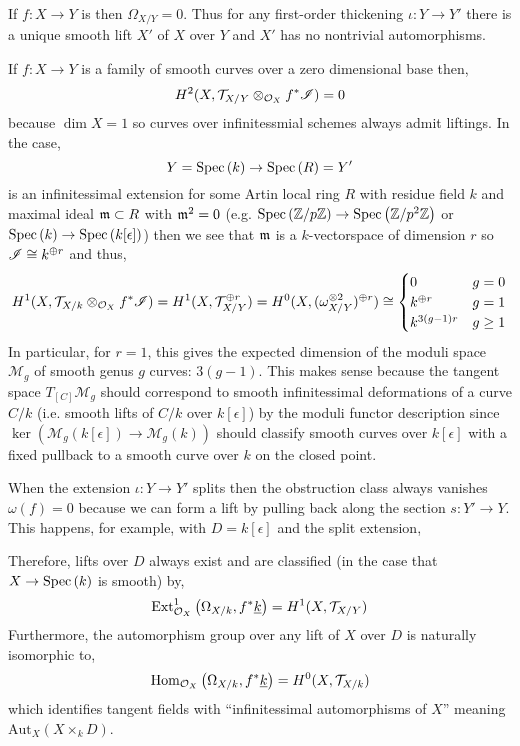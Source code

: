 \documentclass[12pt]{article}
\begin{document}
\begin{example}
If $f : X \to Y$ is \etale then $\Omega_{X/Y} = 0$. Thus for any first-order thickening $\iota : Y \to Y'$ there is a unique smooth lift $X'$ of $X$ over $Y$ and $X'$ has no nontrivial automorphisms.
\end{example}

\begin{example}
If $f : X \to Y$ is a family of smooth curves over a zero dimensional base then, 
\[ H^2(X, \mathcal{T}_{X/Y} \otimes_{\mathcal{O}_{X}} f^* \mathscr{I}) = 0 \]
because $\dim{X} = 1$ so curves over infinitessmial schemes always admit liftings. In the case,
\[ Y = \mathrm{Spec}\left( k \right) \to \mathrm{Spec}\left( R \right) = Y' \]
is an infinitessimal extension for some Artin local ring $R$ with residue field $k$ and maximal ideal $\mathfrak{m} \subset R$ with $\mathfrak{m}^2 = 0$ (e.g. $\mathrm{Spec}\left( \mathbb{Z}/p\mathbb{Z} \right) \to \mathrm{Spec}\left( \mathbb{Z}/p^2\mathbb{Z} \right)$ or $\mathrm{Spec}\left( k \right) \to \mathrm{Spec}\left( k[\epsilon] \right)$) then we see that $\mathfrak{m}$ is a $k$-vectorspace of dimension $r$ so $\mathscr{I} \cong k^{\oplus r}$ and thus,
\[ H^1(X, \mathcal{T}_{X/k} \otimes_{\mathcal{O}_{X}} f^* \mathscr{I}) = H^1(X, \mathcal{T}_{X/Y}^{\oplus r}) = H^0(X, (\omega_{X/Y}^{\otimes 2})^{\oplus r}) \cong 
\begin{cases}
0 & g = 0
\\
k^{\oplus r} & g = 1
\\
k^{3(g-1)r} & g \ge 1 
\end{cases} \]
In particular, for $r = 1$, this gives the expected dimension of the moduli space $\mathcal{M}_g$ of smooth genus $g$ curves: $3(g-1)$. This makes sense because the tangent space $T_{[C]} \mathcal{M}_g$ should correspond to smooth infinitessimal deformations of a curve $C/k$ (i.e. smooth lifts of $C/k$ over $k[\epsilon]$) by the moduli functor description since $\ker{(\mathcal{M}_g(k[\epsilon]) \to \mathcal{M}_g(k))}$ should classify smooth curves over $k[\epsilon]$ with a fixed pullback to a smooth curve over $k$ on the closed point.
\end{example}

\begin{example}
When the extension $\iota : Y \to Y'$ splits then the obstruction class always vanishes $\omega(f) = 0$ because we can form a lift by pulling back along the section $s : Y' \to Y$. This happens, for example, with $D = k[\epsilon]$ and the split extension,
\begin{center}
\end{center}
Therefore, lifts over $D$ always exist and are classified (in the case that $X \to \mathrm{Spec}\left( k \right)$ is smooth) by,
\[ \mathrm{Ext}^{1}_{\mathcal{O}_{X}} \left( \Omega_{X/k}, f^* \underline{k} \right) = H^1(X, \mathcal{T}_{X/Y}) \]
Furthermore, the automorphism group over any lift of $X$ over $D$ is naturally isomorphic to,
\[ \mathrm{Hom}_{\mathcal{O}_{X}} \left( \Omega_{X/k}, f^* \underline{k} \right) = H^0(X, \mathcal{T}_{X/k}) \]
which identifies tangent fields with ``infinitessimal automorphisms of $X$'' meaning $\mathrm{Aut}_X(X \times_k D)$.
\end{example}
\end{document}
